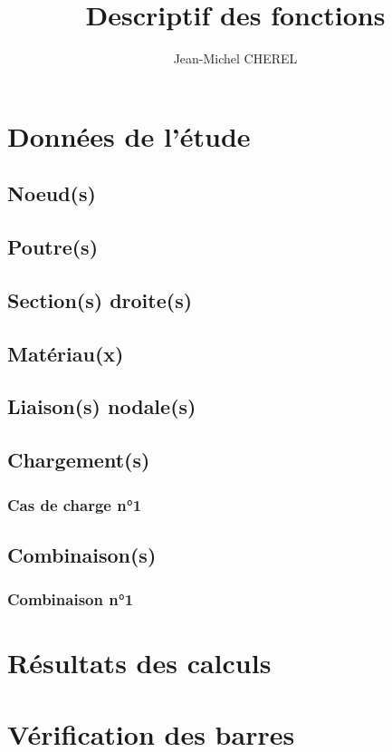 \documentclass[10pt,a4paper,titlepage]{report}
\author{Jean-Michel CHEREL}
\title{Descriptif des fonctions}
\begin{document}
\sffamily

\chapter{Données de l'étude}

\section{Noeud(s)}

\section{Poutre(s)}

\section{Section(s) droite(s)}

\section{Matériau(x)}

\section{Liaison(s) nodale(s)}

\section{Chargement(s)}

\subsection{Cas de charge n°1}

\section{Combinaison(s)}

\subsection{Combinaison n°1}

\chapter{Résultats des calculs}

\chapter{Vérification des barres}
\end{document}
